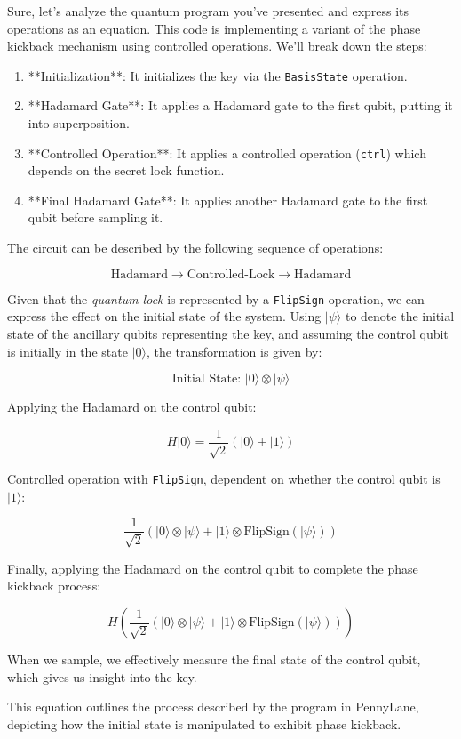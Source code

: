 \begin{airesult}
Sure, let's analyze the quantum program you've presented and express its operations as an equation.
This code is implementing a variant of the phase kickback mechanism using controlled operations.
We'll break down the steps:

\begin{enumerate}
\item **Initialization**: It initializes the key via the \verb|BasisState| operation.
\item **Hadamard Gate**: It applies a Hadamard gate to the first qubit, putting it into
superposition.
\item **Controlled Operation**: It applies a controlled operation (\verb|ctrl|) which depends on the
secret lock function.
\item **Final Hadamard Gate**: It applies another Hadamard gate to the first qubit before sampling
it.
\end{enumerate}

The circuit can be described by the following sequence of operations:

\[
\text{Hadamard} \rightarrow \text{Controlled-Lock} \rightarrow \text{Hadamard}
\]

Given that the \textit{quantum lock} is represented by a \verb|FlipSign| operation, we can express
the effect on the initial state of the system. Using \(|\psi\rangle\) to denote the initial state of
the ancillary qubits representing the key, and assuming the control qubit is initially in the state
\(|0\rangle\), the transformation is given by:

\vsp

\[
\text{Initial State: } |0\rangle \otimes |\psi\rangle
\]

Applying the Hadamard on the control qubit:

\[
H|0\rangle = \dfrac{1}{\sqrt{2}}(|0\rangle + |1\rangle)
\]

Controlled operation with \verb|FlipSign|, dependent on whether the control qubit is \(|1\rangle\):

\[
\dfrac{1}{\sqrt{2}}(|0\rangle \otimes |\psi\rangle + |1\rangle \otimes
\text{FlipSign}(|\psi\rangle))
\]

Finally, applying the Hadamard on the control qubit to complete the phase kickback process:

\[
H \left(\dfrac{1}{\sqrt{2}}(|0\rangle \otimes |\psi\rangle + |1\rangle \otimes
\text{FlipSign}(|\psi\rangle))\right)
\]

When we sample, we effectively measure the final state of the control qubit, which gives us insight
into the key.

\vsp

This equation outlines the process described by the program in PennyLane, depicting how the initial
state is manipulated to exhibit phase kickback.
\end{airesult}


